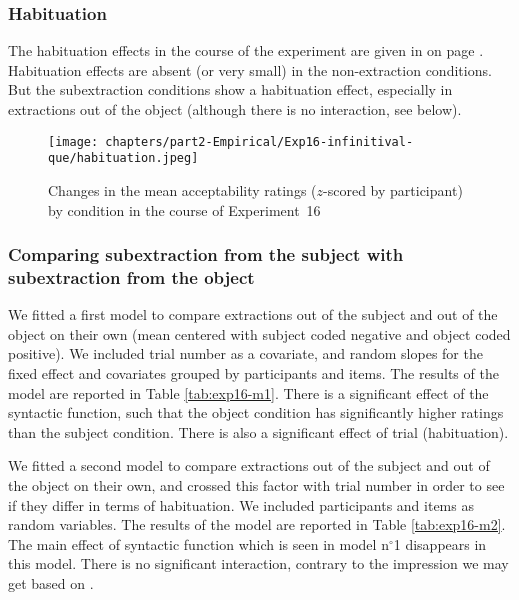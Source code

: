 \subsubsection{Habituation} 

The habituation effects in the course of the experiment are given in  on page \pageref{fig:exp16-habituation}. Habituation effects are absent (or very small) in the non-extraction conditions. But the subextraction conditions show a habituation effect, especially in extractions out of the object (although there is no interaction, see below). 

\begin{figure}
    \centering
    \texttt{[image: chapters/part2-Empirical/Exp16-infinitival-que/habituation.jpeg]}
    \caption{Changes in the mean acceptability ratings ($z$-scored by participant) by condition in the course of Experiment~16}
    \label{fig:exp16-habituation}
\end{figure}

\subsubsection{Comparing subextraction from the subject with subextraction from the object}

We fitted a first model to compare extractions out of the subject and out of the object on their own (mean centered with subject coded negative and object coded positive). We included trial number as a covariate, and random slopes for the fixed effect and covariates grouped by participants and items. The results of the model are reported in Table \ref{tab:exp16-m1}. 
There is a significant effect of the syntactic function, such that the object condition has significantly higher ratings than the subject condition. There is also a significant effect of trial (habituation).



We fitted a second model to compare extractions out of the subject and out of the object on their own, and crossed this factor with trial number in order to see if they differ in terms of habituation. We included participants and items as random variables. The results of the model are reported in Table \ref{tab:exp16-m2}. 
The main effect of syntactic function which is seen in model n$^{\circ}$1 disappears in this model. There is no significant interaction, contrary to the impression we may get based on . 

